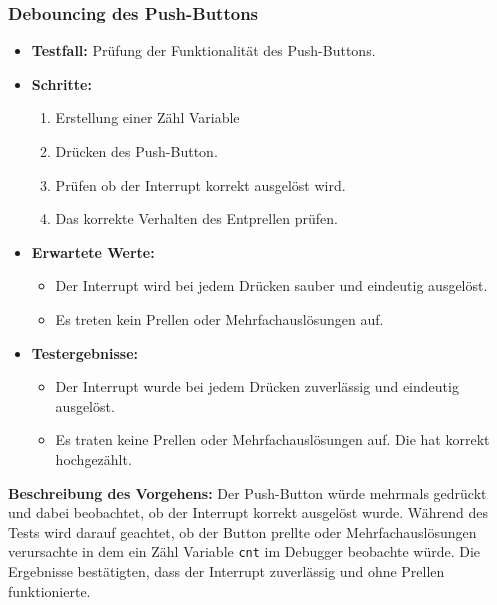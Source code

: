 \subsubsection{Debouncing des Push-Buttons}
\begin{itemize}
	\item \textbf{Testfall:} Prüfung der Funktionalität des Push-Buttons.
	\item \textbf{Schritte:}
	\begin{enumerate}
		\item Erstellung einer Zähl Variable 
		\item Drücken des Push-Button.
		\item Prüfen ob der Interrupt korrekt ausgelöst wird.
		\item Das korrekte Verhalten des Entprellen prüfen.
	\end{enumerate}
	\item \textbf{Erwartete Werte:}
	\begin{itemize}
		\item Der Interrupt wird bei jedem Drücken sauber und eindeutig ausgelöst.
		\item Es treten kein Prellen oder Mehrfachauslösungen auf.
	\end{itemize}
	\item \textbf{Testergebnisse:}
	\begin{itemize}
		\item Der Interrupt wurde bei jedem Drücken zuverlässig und eindeutig ausgelöst.
		\item Es traten keine Prellen oder Mehrfachauslösungen auf. Die  hat korrekt hochgezählt.
	\end{itemize}
\end{itemize}


\textbf{Beschreibung des Vorgehens:}
Der Push-Button würde mehrmals gedrückt und dabei beobachtet, ob der Interrupt korrekt ausgelöst wurde. Während des Tests wird darauf geachtet, ob der Button prellte oder Mehrfachauslösungen verursachte in dem ein Zähl Variable \texttt{cnt} im Debugger beobachte würde. Die Ergebnisse bestätigten, dass der Interrupt zuverlässig und ohne Prellen funktionierte.

